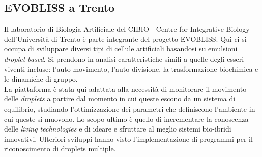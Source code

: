 \subsection{EVOBLISS a Trento}
\label{sec:trento}
Il laboratorio di Biologia Artificiale del CIBIO - Centre for Integrative Biology dell'Università di Trento è parte integrante del progetto EVOBLISS.
Qui ci si occupa di sviluppare diversi tipi di cellule artificiali basandosi su emulsioni \emph{droplet-based}. 
Si prendono in analisi caratteristiche simili a quelle degli esseri viventi incluse: l'auto-movimento, l'auto-divisione, la trasformazione biochimica e le dinamiche di gruppo.
\\La piattaforma è stata qui adattata alla necessità di monitorare il movimento delle \emph{droplets} a partire dal momento in cui queste escono da un sistema di equilibrio, studiando l'ottimizzazione dei parametri che definiscono l'ambiente in cui queste si muovono. Lo scopo ultimo è quello di incrementare la conoscenza delle \emph{living technologies} e di ideare e sfruttare al meglio sistemi bio-ibridi innovativi.
Ulteriori sviluppi hanno visto l'implementazione di programmi per il riconoscimento di droplets multiple. 
 















